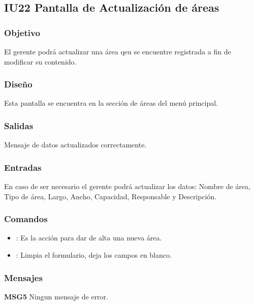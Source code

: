 \subsection{IU22 Pantalla de Actualización de áreas}

\subsubsection{Objetivo}
	El gerente podrá actualizar una área qeu se encuentre registrada a fin de modificar su contenido.

\subsubsection{Diseño}
	Esta pantalla se encuentra en la sección de áreas del menú principal.


\subsubsection{Salidas}

	Mensaje de datos actualizados correctamente.

\subsubsection{Entradas}
En caso de ser necesario el gerente podrá actualizar los datos: Nombre de área, Tipo de área, Largo, Ancho, Capacidad, Responsable y Descripción.

\subsubsection{Comandos}
\begin{itemize}
	\item {}: Es la acción para dar de alta una nueva área.
	\item {}: Limpia el formulario, deja los campos en blanco.
\end{itemize}

\subsubsection{Mensajes}
	\begin{Citemize}
		\item {\bf MSG5} Ningun mensaje de error.
	\end{Citemize}

